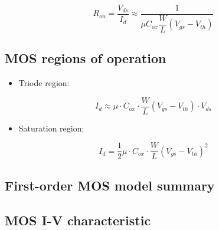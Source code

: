 \documentclass[11pt]{article}
\providecommand{\tightlist}{%
      \setlength{\itemsep}{0pt}\setlength{\parskip}{0pt}}
\begin{document}
\begin{equation}
\boxed{R_{on} = \dfrac{V_{ds}}{I_d} \approx \dfrac{1}{\mu C_{ox} \dfrac{W}{L} (V_{gs} - V_{th})}} 
\end{equation}

    \hypertarget{mos-regions-of-operation}{%
\subsection{MOS regions of operation}\label{mos-regions-of-operation}}

    

    \begin{itemize}
\tightlist
\item
  Triode region:
\end{itemize}

\begin{equation}
I_d \approx \mu \cdot C_{ox} \cdot \dfrac{W}{L} {(V_{gs} - V_{th})\cdot V_{ds}}
\end{equation}

\begin{itemize}
\tightlist
\item
  Saturation region:
\end{itemize}

\begin{equation}
I_d = \dfrac{1}{2}\mu\cdot C_{ox} \cdot \dfrac{W}{L}(V_{gs}-V_{th})^2
\end{equation}

    \hypertarget{first-order-mos-model-summary}{%
\subsection{First-order MOS model
summary}\label{first-order-mos-model-summary}}

    

    \hypertarget{mos-i-v-characteristic}{%
\subsection{MOS I-V characteristic}\label{mos-i-v-characteristic}}
\end{document}

